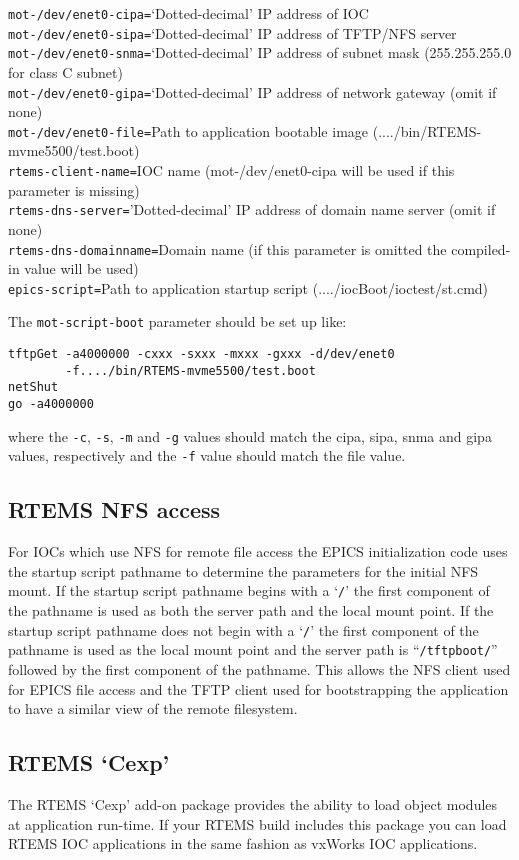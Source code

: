 \noindent
\verb|mot-/dev/enet0-cipa=|`Dotted-decimal' IP address of IOC\\
\verb|mot-/dev/enet0-sipa=|`Dotted-decimal' IP address of TFTP/NFS server\\
\verb|mot-/dev/enet0-snma=|`Dotted-decimal' IP address of subnet mask (255.255.255.0 for class C subnet)\\
\verb|mot-/dev/enet0-gipa=|`Dotted-decimal' IP address of network gateway (omit if none)\\
\verb|mot-/dev/enet0-file=|Path to application bootable image (..../bin/RTEMS-mvme5500/test.boot)\\
\verb|rtems-client-name=|IOC name (mot-/dev/enet0-cipa will be used if this parameter is missing)\\
\verb|rtems-dns-server=|'Dotted-decimal' IP address of domain name server (omit if none)\\
\verb|rtems-dns-domainname=|Domain name (if this parameter is omitted the compiled-in value will be used)\\
\verb|epics-script=|Path to application startup script (..../iocBoot/ioctest/st.cmd)

The \verb|mot-script-boot| parameter should be set up like:

\begin{verbatim}
tftpGet -a4000000 -cxxx -sxxx -mxxx -gxxx -d/dev/enet0
        -f..../bin/RTEMS-mvme5500/test.boot
netShut
go -a4000000
\end{verbatim}

where the \verb|-c|, \verb|-s|, \verb|-m| and \verb|-g| values should match the cipa, sipa, snma and gipa values, respectively and the \verb|-f| value should match the file value.

\subsection{RTEMS NFS access}

For IOCs which use NFS for remote file access the EPICS initialization code uses the startup script pathname to determine the parameters for the initial NFS mount.
If the startup script pathname begins with a `\verb|/|' the first component of the pathname is used as both the server path and the local mount point.
If the startup script pathname does not begin with a `\verb|/|' the first component of the pathname is used as the local mount point and the server path is ``\verb|/tftpboot/|'' followed by the first component of the pathname.
This allows the NFS client used for EPICS file access and the TFTP client used for bootstrapping the application to have a similar view of the remote filesystem.

\subsection{RTEMS `Cexp'}

The RTEMS `Cexp' add-on package provides the ability to load object modules at application run-time.
If your RTEMS build includes this package you can load RTEMS IOC applications in the same fashion as vxWorks IOC applications.


